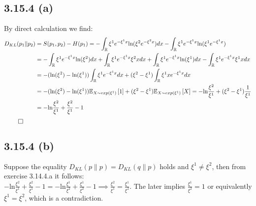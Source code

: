 \documentclass{exam}
\renewenvironment{proof}{{\noindent\itshape\ignorespaces}}{{\hfill$\qed$\\}}
\begin{document}
\subsection*{3.15.4 (a)}
By direct calculation we find:
\begin{proof}
    \begin{equation*}
        \begin{aligned}
           D_{KL}(p_1 \lVert p_2) &= S(p_1,p_2) - H(p_1) = -\displaystyle\int_{\mathbb{R}}  \xi^1 e^{-\xi^1 x} \text{ln}(\xi^2e^{-\xi^2 x}) dx  -\displaystyle\int_{\mathbb{R}}  \xi^1 e^{-\xi^1 x} \text{ln}(\xi^1e^{-\xi^1 x}) \\
           &= -\displaystyle\int_{\mathbb{R}}  \xi^1 e^{-\xi^1 x} \text{ln}(\xi^2) dx + \displaystyle\int_{\mathbb{R}}  \xi^{1} e^{-\xi^1 x} \xi^{2} x d x + \displaystyle\int_{\mathbb{R}} \xi^1 e^{-\xi^1 x} \text{ln}(\xi^1) dx  - \displaystyle\int_{\mathbb{R}} \xi^{1}e^{-\xi^{1}x} \xi^{1} x d x \\
           &= - (\text{ln}(\xi^{2}) - \text{ln}(\xi^{1}))\displaystyle\int_{\mathbb{R}}  \xi^1 e^{-\xi^1 x} dx + (\xi^{2} - \xi^{1})\displaystyle\int_{\mathbb{R}} \xi^1 x e^{-\xi^1 x} dx \\ 
           &= - (\text{ln}(\xi^{2}) - \text{ln}(\xi^{1}))\mathbb{E}_{\tiny X \sim exp(\xi^{1})}\left[1\right] + (\xi^{2} - \xi^{1})\mathbb{E}_{\tiny X \sim exp(\xi^{1})}\left[ X \right] = - \text{ln}\frac{\xi^{2}}{\xi^{1}} + (\xi^{2} - \xi^{1})\frac{1}{\xi^{1}} \\
           &= - \text{ln}\frac{\xi^{2}}{\xi^{1}} + \frac{\xi^{2}}{\xi^{1}} - 1
        \end{aligned}
    \end{equation*}
\end{proof}

\subsection*{3.15.4 (b)}
Suppose the equality $D_{KL}(p \lVert p) = D_{KL}(q \lVert p)$ holds and $\xi^{1} \neq \xi^{2}$, then from exercise 3.14.4.a it follows: \\
$- \text{ln}\frac{\xi^{2}}{\xi^{1}} + \frac{\xi^{2}}{\xi^{1}} - 1 = - \text{ln}\frac{\xi^{1}}{\xi^{2}} + \frac{\xi^{1}}{\xi^{2}} - 1 \implies \frac{\xi^{2}}{\xi^{1}} = \frac{\xi^{1}}{\xi^{2}}$. The later implies 
$\frac{\xi^{1}}{\xi^{2}} = 1$ or equivalently $\xi^{1} = \xi^{2}$, which is a contradiction. 
\end{document}
